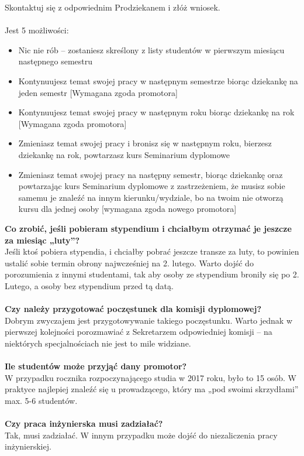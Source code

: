 \documentclass[11pt]{article}
\begin{document}
Skontaktuj się z odpowiednim Prodziekanem i złóż wniosek.  \\\\
Jest 5 możliwości:\\
\begin{itemize}
\item Nic nie rób -- zostaniesz skreślony z listy studentów w pierwszym miesiącu następnego semestru
\item Kontynuujesz temat swojej pracy w następnym semestrze biorąc dziekankę na jeden semestr [Wymagana zgoda promotora]
\item  Kontynuujesz temat swojej pracy w następnym roku biorąc dziekankę na rok [Wymagana zgoda promotora]
\item Zmieniasz temat swojej pracy i bronisz się w następnym roku, bierzesz dziekankę na rok, powtarzasz kurs Seminarium dyplomowe
\item Zmieniasz temat swojej pracy na następny semestr, biorąc dziekankę oraz powtarzając kurs Seminarium dyplomowe z zastrzeżeniem, że musisz sobie samemu je znaleźć na innym kierunku/wydziale, bo na twoim nie otworzą kursu dla jednej osoby [wymagana zgoda nowego promotora]
\end{itemize}
\textbf{Co zrobić, jeśli pobieram stypendium i chciałbym otrzymać je jeszcze za miesiąc „luty”?} \\
\indent Jeśli ktoś pobiera stypendia, i chciałby pobrać jeszcze transze za luty, to powinien ustalić sobie termin obrony najwcześniej na 2. lutego. Warto dojść do porozumienia z innymi studentami, tak aby osoby ze stypendium broniły się po 2. Lutego, a osoby bez stypendium przed tą datą. \\\\
\textbf{Czy należy przygotować poczęstunek dla komisji dyplomowej?} \\
\indent Dobrym zwyczajem jest przygotowywanie takiego poczęstunku. Warto jednak w pierwszej kolejności porozmawiać z Sekretarzem odpowiedniej komisji – na niektórych specjalnościach nie jest to mile widziane. \\\\
\textbf{Ile studentów może przyjąć dany promotor?} \\
\indent W przypadku rocznika rozpoczynającego studia w 2017 roku, było to 15 osób. W praktyce najlepiej znaleźć się u prowadzącego, który ma „pod swoimi skrzydłami” max. 5-6 studentów. \\\\
\textbf{Czy praca inżynierska musi zadziałać?} \\
\indent Tak, musi zadziałać. W innym przypadku może dojść do niezaliczenia pracy inżynierskiej. 
\end{document}
